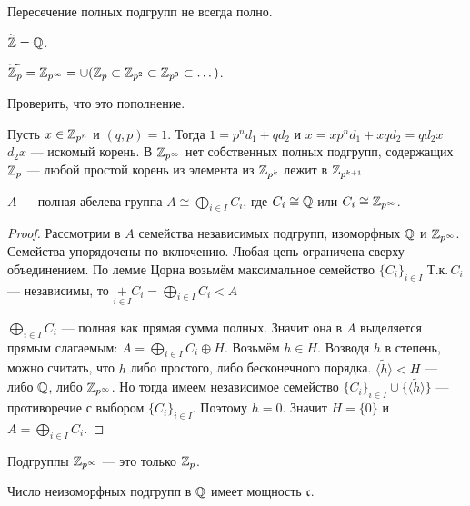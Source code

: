 \documentclass[10pt,a4paper]{article}%
\newcommand{\inst}{}
\begin{document}
\begin{note}
Пересечение полных подгрупп не всегда полно.
\end{note}

\begin{ex}$\widetilde{\mathbb Z}=\mathbb Q$.
\end{ex}

\begin{ex}$\widetilde{\mathbb Z_p}=\mathbb Z_{p^\infty}=\cup(\mathbb Z_p\subset\mathbb Z_{p^2}\subset\mathbb Z_{p^3}\subset
\dots)$.
\end{ex}

\begin{problem} Проверить, что это
пополнение.
\end{problem}
\inst Пусть $x\in\mathbb Z_{p^n}$ и $(q,p)=1$.
Тогда $1=p^nd_1+qd_2$ и $x=xp^nd_1+xqd_2=qd_2x$ $d_2x$ --- искомый
корень. В $\mathbb Z_{p^\infty}$ нет собственных полных подгрупп,
содержащих $\mathbb Z_p$
--- любой простой корень из элемента из $\mathbb Z_{p^k}$ лежит в
$\mathbb Z_{p^{k+1}}$

\begin{theorem}
{$A$ --- полная абелева группа \ifif $A\cong
\bigoplus\limits_{i\in I}C_i$, где $C_i\cong\mathbb Q$ или
$C_i\cong\mathbb Z_{p^\infty}$.}\label{completeness_criterion}
\end{theorem}

\begin{proof} Рассмотрим в $A$ семейства независимых подгрупп, изоморфных
$\mathbb Q$ и $\mathbb Z_{p^\infty}$. Семейства упорядочены по включению.
Любая цепь ограничена сверху объединением. По лемме Цорна возьмём
максимальное семейство $\{C_i\}_{i\in I}$ Т.к.\,$C_i$ ---
независимы, то $\mathop+\limits_{i\in I}C_i=\bigoplus\limits_{i\in
I}C_i<A$

$\bigoplus\limits_{i\in I}C_i$ --- полная как прямая сумма полных.
Значит она в $A$ выделяется прямым слагаемым:
$A=\bigoplus\limits_{i\in I}C_i\oplus H$. Возьмём $h\in H$.
Возводя $h$ в степень, можно считать, что $h$ либо простого, либо
бесконечного порядка. $\widetilde{\langle h\rangle}<H$ --- либо
$\mathbb Q$, либо $\mathbb Z_{p^\infty}$. Но тогда имеем независимое семейство
$\{C_i\}_{i\in I}\cup\{\widetilde{\langle h\rangle}\}$ ---
противоречие с выбором $\{C_i\}_{i\in I}$. Поэтому $h=0$. Значит
$H=\{0\}$ и $A=\bigoplus\limits_{i\in I}C_i$.\end{proof}

\begin{problem} Подгруппы $\mathbb Z_{p^\infty}$ --- это только
$\mathbb Z_p$.
\end{problem}

\begin{theorem}Число неизоморфных подгрупп в $\mathbb Q$ имеет мощность
$\mathfrak{c}$.
\end{theorem}
\end{document}
